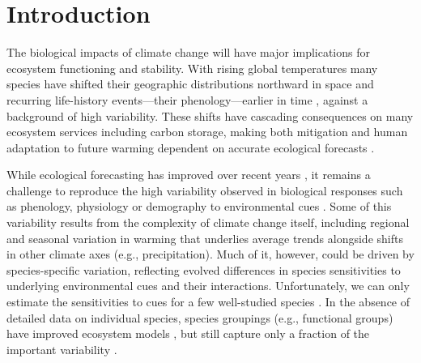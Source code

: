\documentclass[11pt]{article}
\begin{document}
\section*{Introduction}
The biological impacts of climate change will have major implications for ecosystem functioning and stability. With rising global temperatures many species have shifted their geographic distributions northward in space and recurring life-history events---their phenology---earlier in time \citep{IPCC:2014sm,parmesan2003}, against a background of high variability. These shifts have cascading consequences on many ecosystem services including carbon storage, making both mitigation and human adaptation to future warming dependent on accurate ecological forecasts \citep{richardson2013}. 

While ecological forecasting has improved over recent years \citep{dietze2017ecological,lewis2022power}, it remains a challenge to reproduce the high variability observed in biological responses such as phenology, physiology or demography to environmental cues \citep{IPCC:2014sm}. Some of this variability results from the complexity of climate change itself, including regional and seasonal variation in warming that underlies average trends alongside shifts in other climate axes (e.g.,  precipitation). Much of it, however, could be driven by species-specific variation, reflecting evolved differences in species sensitivities to underlying environmental cues and their interactions. Unfortunately, we can only estimate the sensitivities to cues for a few well-studied species \citep{chuinearees,ettinger2020}. In the absence of detailed data on individual species, species groupings (e.g., functional groups) have improved ecosystem models \citep{ed2001,griffith2020}, but still capture only a fraction of the important variability \citep{fuccillo2022}.%
\end{document}
